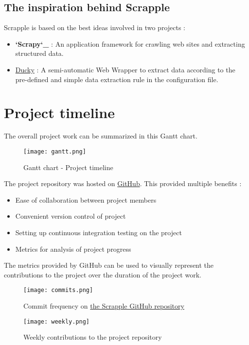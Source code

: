 \documentclass[letterpaper,12pt,english]{sphinxmanual}
\begin{document}
\section{The inspiration behind Scrapple}
\label{index:the-inspiration-behind-scrapple}
Scrapple is based on the best ideas involved in two projects :
\begin{itemize}
\item {} 
{\color{red}\bfseries{}{}`Scrapy{}`\_} : An application framework for crawling web sites and extracting structured data.

\item {} 
\href{http://dl.acm.org/citation.cfm?id=2628244}{Ducky} : A semi-automatic Web Wrapper to extract data according to the pre-defined and simple data extraction rule in the configuration file.

\end{itemize}


\chapter{Project timeline}
\label{index:project-timeline}\label{index:ducky}
The overall project work can be summarized in this Gantt chart.
\begin{figure}[htbp]
\centering
\capstart

\texttt{[image: gantt.png]}
\caption{Gantt chart - Project timeline}\end{figure}

The project repository was hosted on \href{http://github.com/}{GitHub}. This provided multiple benefits :
\begin{itemize}
\item {} 
Ease of collaboration between project members

\item {} 
Convenient version control of project

\item {} 
Setting up continuous integration testing on the project

\item {} 
Metrics for analysis of project progress

\end{itemize}

The metrics provided by GitHub can be used to visually represent the contributions to the project over the duration of the project work.
\begin{figure}[htbp]
\centering
\capstart

\texttt{[image: commits.png]}
\caption{Commit frequency on \href{http://github.com/scrappleapp/scrapple}{the Scrapple GitHub repository}}\end{figure}
\begin{figure}[htbp]
\centering
\capstart

\texttt{[image: weekly.png]}
\caption{Weekly contributions to the project repository}\end{figure}
\end{document}
